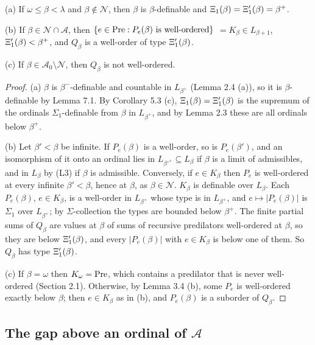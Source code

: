 \documentclass[11pt]{article}
\begin{document}
\begin{statement} (a) If $\omega \le \beta < \lambda$ and $\beta \notin \mathcal N$, then $\beta$ is
$\beta$-definable and $\Xi_1(\beta) = \Xi'_1(\beta) = \beta^+$.

(b) If $\beta \in \mathcal N \cap \mathcal A$, then $\{e \in \mathrm{Pre} : P_e(\beta) \text{ is well-ordered}\}$ ${}= K_{\beta}
\in L_{\beta + 1}$, $\Xi'_1(\beta) < \beta^+$, and $Q_{\beta}$ is a well-order of type $\Xi'_1(\beta)$.

(c) If $\beta \in \mathcal A_0 \setminus \mathcal N$, then $Q_{\beta}$ is not well-ordered.
\end{statement}

\begin{proof} (a) $\beta$ is $\beta^-$-definable and countable in $L_{\beta^+}$ (Lemma 2.4 (a)), so it is
$\beta$-definable by Lemma 7.1. By Corollary 5.3 (c), $\Xi_1(\beta) = \Xi'_1(\beta)$ is the supremum of the ordinals
$\Sigma_1$-definable from $\beta$ in $L_{\beta^+}$, and by Lemma 2.3 these are all ordinals below $\beta^+$.

(b) Let $\beta' < \beta$ be infinite. If $P_e(\beta)$ is a well-order, so is $P_e(\beta')$, and an isomorphism of
it onto an ordinal lies in $L_{\beta'^+} \subseteq L_{\beta}$ if $\beta$ is a limit of admissibles, and in $L_\beta$
by (L3) if $\beta$ is admissible. Conversely, if $e \in K_{\beta}$ then $P_e$ is well-ordered at every infinite
$\beta' < \beta$, hence at $\beta$, as $\beta \in \mathcal N$. $K_{\beta}$ is definable over $L_{\beta}$. Each
$P_e(\beta)$, $e \in K_{\beta}$, is a well-order in $L_{\beta^+}$ whose type is in $L_{\beta^+}$, and
$e \mapsto |P_e(\beta)|$ is $\Sigma_1$ over $L_{\beta^+}$; by $\Sigma$-collection the types are bounded below
$\beta^+$. The finite partial sums of $Q_{\beta}$ are values at $\beta$ of sums of recursive predilators
well-ordered at $\beta$, so they are below $\Xi'_1(\beta)$, and every $|P_e(\beta)|$ with $e \in K_{\beta}$ is below
one of them. So $Q_{\beta}$ has type $\Xi'_1(\beta)$.

(c) If $\beta = \omega$ then $K_{\omega} = \mathrm{Pre}$, which contains a predilator that is never well-ordered (Section
2.1). Otherwise, by Lemma 3.4 (b), some $P_e$ is well-ordered exactly below $\beta$; then $e \in K_{\beta}$ as in
(b), and $P_e(\beta)$ is a suborder of $Q_{\beta}$.
\end{proof}

\subsection{The gap above an ordinal of \texorpdfstring{$\mathcal A$}{A}}
\end{document}
